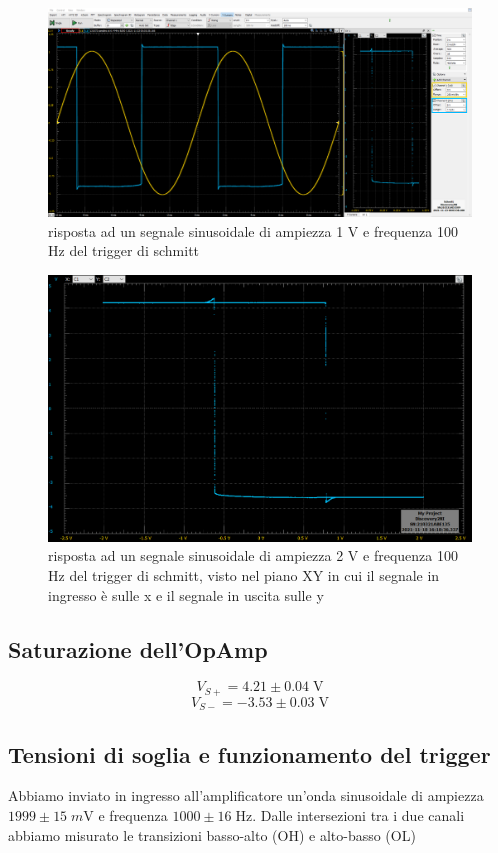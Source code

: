 \documentclass[10pt,a4paper]{article}
\begin{document}
\begin{figure}[htbp]
\centering
\includegraphics[scale=0.4]{schmitt}
\caption{risposta ad un segnale sinusoidale di ampiezza 1 V e frequenza 100 Hz del trigger di schmitt}
\end{figure}

\begin{figure}[htbp]
\centering
\includegraphics[scale=0.4]{shmitt_isteresi}
\caption{risposta ad un segnale sinusoidale di ampiezza 2 V e frequenza 100 Hz del trigger di schmitt, visto nel piano XY in cui il segnale in ingresso è sulle x e il segnale in uscita sulle y}
\end{figure}


\subsection{Saturazione dell'OpAmp}

\[
V_{S+} = 4.21 \pm 0.04 \; \si{\V}
\]
\[
V_{S-} = -3.53 \pm 0.03 \; \si{\V}
\]
\subsection{Tensioni di soglia e funzionamento del trigger}
Abbiamo inviato in ingresso all'amplificatore un'onda sinusoidale di ampiezza
$1999 \pm 15 \; \si{m\V}$ e frequenza $1000 \pm 16 \; \si{\Hz}$.
Dalle intersezioni tra i due canali abbiamo misurato le transizioni basso-alto
(OH) e alto-basso (OL)
\end{document}
